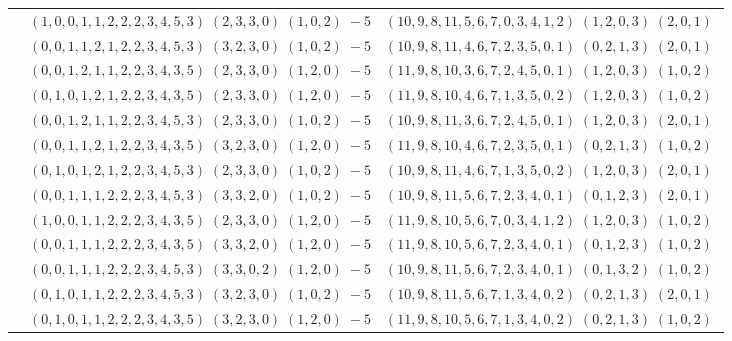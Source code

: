 \documentclass[11pt]{article}
\begin{document}
\begin{longtable}[l]{|c|c|c|}
 \cline{2-3} 
 & $(1 ,0 ,0 ,1 ,1 ,2 ,2 ,2 ,3 ,4 ,5 ,3) \;(2 ,3 ,3 ,0) \;(1 ,0 ,2) \;-5$ & $(10 ,9 ,8 ,11 ,5 ,6 ,7 ,0 ,3 ,4 ,1 ,2) \;(1 ,2 ,0 ,3) \;(2 ,0 ,1) \;$\\ 
 \cline{2-3} 
 & $(0 ,0 ,1 ,1 ,2 ,1 ,2 ,2 ,3 ,4 ,5 ,3) \;(3 ,2 ,3 ,0) \;(1 ,0 ,2) \;-5$ & $(10 ,9 ,8 ,11 ,4 ,6 ,7 ,2 ,3 ,5 ,0 ,1) \;(0 ,2 ,1 ,3) \;(2 ,0 ,1) \;$\\ 
 \cline{2-3} 
 & $(0 ,0 ,1 ,2 ,1 ,1 ,2 ,2 ,3 ,4 ,3 ,5) \;(2 ,3 ,3 ,0) \;(1 ,2 ,0) \;-5$ & $(11 ,9 ,8 ,10 ,3 ,6 ,7 ,2 ,4 ,5 ,0 ,1) \;(1 ,2 ,0 ,3) \;(1 ,0 ,2) \;$\\ 
 \cline{2-3} 
 & $(0 ,1 ,0 ,1 ,2 ,1 ,2 ,2 ,3 ,4 ,3 ,5) \;(2 ,3 ,3 ,0) \;(1 ,2 ,0) \;-5$ & $(11 ,9 ,8 ,10 ,4 ,6 ,7 ,1 ,3 ,5 ,0 ,2) \;(1 ,2 ,0 ,3) \;(1 ,0 ,2) \;$\\ 
 \cline{2-3} 
 & $(0 ,0 ,1 ,2 ,1 ,1 ,2 ,2 ,3 ,4 ,5 ,3) \;(2 ,3 ,3 ,0) \;(1 ,0 ,2) \;-5$ & $(10 ,9 ,8 ,11 ,3 ,6 ,7 ,2 ,4 ,5 ,0 ,1) \;(1 ,2 ,0 ,3) \;(2 ,0 ,1) \;$\\ 
 \cline{2-3} 
 & $(0 ,0 ,1 ,1 ,2 ,1 ,2 ,2 ,3 ,4 ,3 ,5) \;(3 ,2 ,3 ,0) \;(1 ,2 ,0) \;-5$ & $(11 ,9 ,8 ,10 ,4 ,6 ,7 ,2 ,3 ,5 ,0 ,1) \;(0 ,2 ,1 ,3) \;(1 ,0 ,2) \;$\\ 
 \cline{2-3} 
 & $(0 ,1 ,0 ,1 ,2 ,1 ,2 ,2 ,3 ,4 ,5 ,3) \;(2 ,3 ,3 ,0) \;(1 ,0 ,2) \;-5$ & $(10 ,9 ,8 ,11 ,4 ,6 ,7 ,1 ,3 ,5 ,0 ,2) \;(1 ,2 ,0 ,3) \;(2 ,0 ,1) \;$\\ 
 \cline{2-3} 
 & $(0 ,0 ,1 ,1 ,1 ,2 ,2 ,2 ,3 ,4 ,5 ,3) \;(3 ,3 ,2 ,0) \;(1 ,0 ,2) \;-5$ & $(10 ,9 ,8 ,11 ,5 ,6 ,7 ,2 ,3 ,4 ,0 ,1) \;(0 ,1 ,2 ,3) \;(2 ,0 ,1) \;$\\ 
 \cline{2-3} 
 & $(1 ,0 ,0 ,1 ,1 ,2 ,2 ,2 ,3 ,4 ,3 ,5) \;(2 ,3 ,3 ,0) \;(1 ,2 ,0) \;-5$ & $(11 ,9 ,8 ,10 ,5 ,6 ,7 ,0 ,3 ,4 ,1 ,2) \;(1 ,2 ,0 ,3) \;(1 ,0 ,2) \;$\\ 
 \cline{2-3} 
 & $(0 ,0 ,1 ,1 ,1 ,2 ,2 ,2 ,3 ,4 ,3 ,5) \;(3 ,3 ,2 ,0) \;(1 ,2 ,0) \;-5$ & $(11 ,9 ,8 ,10 ,5 ,6 ,7 ,2 ,3 ,4 ,0 ,1) \;(0 ,1 ,2 ,3) \;(1 ,0 ,2) \;$\\ 
 \cline{2-3} 
 & $(0 ,0 ,1 ,1 ,1 ,2 ,2 ,2 ,3 ,4 ,5 ,3) \;(3 ,3 ,0 ,2) \;(1 ,2 ,0) \;-5$ & $(10 ,9 ,8 ,11 ,5 ,6 ,7 ,2 ,3 ,4 ,0 ,1) \;(0 ,1 ,3 ,2) \;(1 ,0 ,2) \;$\\ 
 \cline{2-3} 
 & $(0 ,1 ,0 ,1 ,1 ,2 ,2 ,2 ,3 ,4 ,5 ,3) \;(3 ,2 ,3 ,0) \;(1 ,0 ,2) \;-5$ & $(10 ,9 ,8 ,11 ,5 ,6 ,7 ,1 ,3 ,4 ,0 ,2) \;(0 ,2 ,1 ,3) \;(2 ,0 ,1) \;$\\ 
 \cline{2-3} 
 & $(0 ,1 ,0 ,1 ,1 ,2 ,2 ,2 ,3 ,4 ,3 ,5) \;(3 ,2 ,3 ,0) \;(1 ,2 ,0) \;-5$ & $(11 ,9 ,8 ,10 ,5 ,6 ,7 ,1 ,3 ,4 ,0 ,2) \;(0 ,2 ,1 ,3) \;(1 ,0 ,2) \;$\\ 

\end{longtable}
\end{document}
